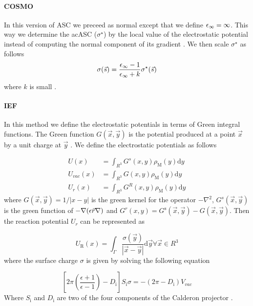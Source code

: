 \documentclass[../master_thesis.tex]{subfiles}
\begin{document}
\paragraph{\ac{COSMO}}
In this version of \ac{ASC} we preceed as normal except that we define $\epsilon_{\infty} = \infty$.
This way we determine the {ac{ASC}} ($\sigma^{\star}$) by the local value of the electrostatic
potential instead of computing the normal component of its gradient \cite{Tomasi:2005ipa}.
We then scale $\sigma^{\star}$ as follows
\begin{equation}
  \sigma(\vec{s}) = \frac{\epsilon_{\infty} -1}{\epsilon_{\infty} + k}\sigma^{\star}(\vec{s})
\end{equation}
where $k$ is small \cite{Tomasi:2005ipa}.

\paragraph{\ac{IEF}}
In this method we define the electrostatic potentials in terms of Green integral
functions. The Green function $G(\vec{x}, \vec{y})$ is the potential produced at
a point $\vec{x}$ by a unit charge at $\vec{y}$ \cite{Tomasi:2005ipa}. We define
the electrostatic potentials as follows

\begin{equation}
\begin{aligned} U(x) &=\int_{R^{3}} G^{s}(x, y) \rho_{\mathrm{M}}(y) \mathrm{d} y \\
  U_{vac}(x) &=\int_{R^{3}} G(x, y) \rho_{\mathrm{M}}(y) \mathrm{d} y \\
  U_{r}(x) &=\int_{R^{3}} G^{R}(x, y) \rho_{\mathrm{M}}(y) \mathrm{d} y \end{aligned}
\end{equation}
where $G(\vec{x}, \vec{y})=1 /|x-y|$ is the green kernel for the operator
$-\nabla^2$, $G^s(\vec{x}, \vec{y})$  is the green function of
$-\nabla(\epsilon{\vec{r}}\nabla)$ and $G^{r}(x, y)=G^{\mathrm{s}}(\vec{x},
\vec{y})-G(\vec{x}, \vec{y})$. Then the reaction potential $U_r$ can be represented
as  \cite{Tomasi:2005ipa}

\begin{equation}
U_{\mathrm{R}}(x)=\int_{\Gamma} \frac{\sigma(\vec{y})}{|\vec{x}-\vec{y}|}
\mathrm{d} \vec{y} \forall \vec{x} \in R^{3}
\end{equation}
where the surface charge $\sigma$ is given by solving the following equation

\begin{equation}
\left[2 \pi\left(\frac{\epsilon+1}{\epsilon-1}\right)-D_{\mathrm{i}}\right] S_{\mathrm{i}} \sigma=-\left(2 \pi-D_{\mathrm{i}}\right) V_{vac}
\end{equation}
Where $S_{\mathrm{i}}$ and  $D_{\mathrm{i}}$ are two of the four components of the Calderon projector \cite{Tomasi:2005ipa}.
\end{document}
